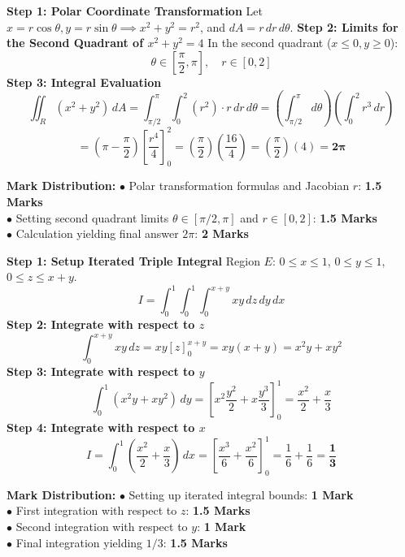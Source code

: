 \begin{solutionbox}
\textbf{Step 1: Polar Coordinate Transformation}
Let $x = r\cos\theta, y = r\sin\theta \implies x^2 + y^2 = r^2$, and $dA = r \, dr \, d\theta$.
\textbf{Step 2: Limits for the Second Quadrant of $x^2 + y^2 = 4$}
In the second quadrant ($x \le 0, y \ge 0$):
\[
\theta \in \left[\frac{\pi}{2}, \pi\right], \quad r \in [0, 2]
\]
\textbf{Step 3: Integral Evaluation}
\[
\iint_R (x^2 + y^2) \, dA = \int_{\pi/2}^\pi \int_0^2 (r^2) \cdot r \, dr \, d\theta = \left(\int_{\pi/2}^\pi d\theta\right) \left(\int_0^2 r^3 \, dr\right)
\]
\[
= \left(\pi - \frac{\pi}{2}\right) \left[ \frac{r^4}{4} \right]_0^2 = \left(\frac{\pi}{2}\right) \left(\frac{16}{4}\right) = \left(\frac{\pi}{2}\right)(4) = \mathbf{2\pi}
\]

\begin{markingrubric}
\textbf{Mark Distribution:}
$\bullet$ Polar transformation formulas and Jacobian $r$: \textbf{1.5 Marks}\\
$\bullet$ Setting second quadrant limits $\theta \in [\pi/2, \pi]$ and $r \in [0, 2]$: \textbf{1.5 Marks}\\
$\bullet$ Calculation yielding final answer $2\pi$: \textbf{2 Marks}
\end{markingrubric}
\end{solutionbox}

\begin{solutionbox}
\textbf{Step 1: Setup Iterated Triple Integral}
Region $E$: $0 \le x \le 1$, $0 \le y \le 1$, $0 \le z \le x + y$.
\[
I = \int_0^1 \int_0^1 \int_0^{x+y} xy \, dz \, dy \, dx
\]
\textbf{Step 2: Integrate with respect to $z$}
\[
\int_0^{x+y} xy \, dz = xy [z]_0^{x+y} = xy(x+y) = x^2 y + x y^2
\]
\textbf{Step 3: Integrate with respect to $y$}
\[
\int_0^1 (x^2 y + x y^2) \, dy = \left[ x^2 \frac{y^2}{2} + x \frac{y^3}{3} \right]_0^1 = \frac{x^2}{2} + \frac{x}{3}
\]
\textbf{Step 4: Integrate with respect to $x$}
\[
I = \int_0^1 \left(\frac{x^2}{2} + \frac{x}{3}\right) \, dx = \left[ \frac{x^3}{6} + \frac{x^2}{6} \right]_0^1 = \frac{1}{6} + \frac{1}{6} = \mathbf{\frac{1}{3}}
\]

\begin{markingrubric}
\textbf{Mark Distribution:}
$\bullet$ Setting up iterated integral bounds: \textbf{1 Mark}\\
$\bullet$ First integration with respect to $z$: \textbf{1.5 Marks}\\
$\bullet$ Second integration with respect to $y$: \textbf{1 Mark}\\
$\bullet$ Final integration yielding $1/3$: \textbf{1.5 Marks}
\end{markingrubric}
\end{solutionbox}

\newpage

